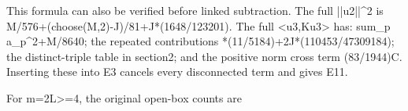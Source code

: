 \documentclass[11pt,a4paper]{article}
\renewcommand{\[}{\begingroup\small\originaldisplaystart}
\renewcommand{\]}{\originaldisplayend\endgroup}
\begin{document}
\[
\] This formula can also be verified before linked subtraction. The full
{\ttfamily |\allowbreak{}|\allowbreak{}u\allowbreak{}2\allowbreak{}|\allowbreak{}|\allowbreak{}\textasciicircum{}\allowbreak{}2\allowbreak{}}
is
{\ttfamily M\allowbreak{}/\allowbreak{}5\allowbreak{}7\allowbreak{}6\allowbreak{}+\allowbreak{}(\allowbreak{}c\allowbreak{}h\allowbreak{}o\allowbreak{}o\allowbreak{}s\allowbreak{}e\allowbreak{}(\allowbreak{}M\allowbreak{},\allowbreak{}2\allowbreak{})\allowbreak{}-\allowbreak{}J\allowbreak{})\allowbreak{}/\allowbreak{}8\allowbreak{}1\allowbreak{}+\allowbreak{}J\allowbreak{}*\allowbreak{}(\allowbreak{}1\allowbreak{}6\allowbreak{}4\allowbreak{}8\allowbreak{}/\allowbreak{}1\allowbreak{}2\allowbreak{}3\allowbreak{}2\allowbreak{}0\allowbreak{}1\allowbreak{})\allowbreak{}}.
The full
{\ttfamily \textless{}\allowbreak{}u\allowbreak{}3\allowbreak{},\allowbreak{}K\allowbreak{}u\allowbreak{}3\allowbreak{}\textgreater{}\allowbreak{}}
has:
{\allowbreak{} \allowbreak{}s\allowbreak{}u\allowbreak{}m\allowbreak{}\_\allowbreak{}p\allowbreak{} \allowbreak{}a\allowbreak{}\_\allowbreak{}p\allowbreak{}\textasciicircum{}\allowbreak{}2\allowbreak{}+\allowbreak{}M\allowbreak{}/\allowbreak{}8\allowbreak{}6\allowbreak{}4\allowbreak{}0\allowbreak{}};
the repeated contributions
{\allowbreak{}*\allowbreak{}(\allowbreak{}1\allowbreak{}1\allowbreak{}/\allowbreak{}5\allowbreak{}1\allowbreak{}8\allowbreak{}4\allowbreak{})\allowbreak{}+\allowbreak{}2\allowbreak{}J\allowbreak{}*\allowbreak{}(\allowbreak{}1\allowbreak{}1\allowbreak{}0\allowbreak{}4\allowbreak{}5\allowbreak{}3\allowbreak{}/\allowbreak{}4\allowbreak{}7\allowbreak{}3\allowbreak{}0\allowbreak{}9\allowbreak{}1\allowbreak{}8\allowbreak{}4\allowbreak{})\allowbreak{}};
the distinct-triple table in section2; and the positive norm cross term
{\ttfamily (\allowbreak{}8\allowbreak{}3\allowbreak{}/\allowbreak{}1\allowbreak{}9\allowbreak{}4\allowbreak{}4\allowbreak{})\allowbreak{}C\allowbreak{}}.
Inserting these into E3 cancels every disconnected term and gives E11.

For
{\ttfamily m\allowbreak{}=\allowbreak{}2\allowbreak{}L\allowbreak{}\textgreater{}\allowbreak{}=\allowbreak{}4\allowbreak{}},
the original open-box counts are
\end{document}
